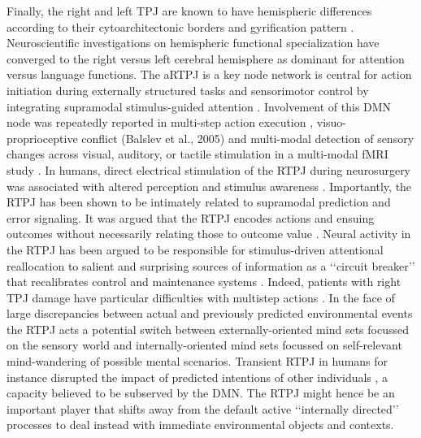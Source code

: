 \documentclass{article} %
\begin{document}
Finally,
the right and left TPJ are known to have hemispheric differences
according to their cytoarchitectonic borders and gyrification pattern
\citep{seghier2013angular}.
Neuroscientific investigations on hemispheric functional specialization
have converged to the right versus left cerebral hemisphere as dominant for
attention versus language functions.
%
The aRTPJ is a key node network is central for
action initiation during externally structured tasks and
sensorimotor control by integrating supramodal stimulus-guided attention
\citep{corbetta2002control}.
Involvement of this DMN node was repeatedly reported in
multi-step action execution \citep{hartmann2005takes},
visuo-proprioceptive conflict (Balslev et al., 2005) and
multi-modal detection of sensory changes across
visual, auditory, or tactile stimulation in a multi-modal fMRI study
\citep{downar2000multimodal}.
In humans, direct electrical stimulation of the
RTPJ during neurosurgery was associated with altered perception
and stimulus awareness \citep{blanke2002neuropsychology}.
%
Importantly, the RTPJ has been shown to be intimately related to
supramodal prediction and error signaling.
It was argued that the RTPJ encodes actions and ensuing outcomes
without necessarily relating those to outcome value
\citep{liljeholm2013neural, hamilton2008action,
jakobs2009effects}.
Neural activity in the RTPJ has been argued to be responsible
for stimulus-driven attentional reallocation to
salient and surprising sources of information
as a ‘‘circuit breaker’’ that recalibrates control and maintenance systems
\citep{bzdok2013tpj, corbettashul2008}.
Indeed, patients with right TPJ damage have particular difficulties
with multistep actions \citep{hartmann2005takes}.
In the face of large discrepancies between actual and previously predicted
environmental events the RTPJ acts a potential switch between
externally-oriented mind sets focussed on the
sensory world and internally-oriented mind sets focussed
on self-relevant mind-wandering of possible mental scenarios.
Transient RTPJ in humans for instance disrupted the
impact of predicted intentions of other individuals
\citep{young2010disruption},
a capacity believed to be subserved by the DMN.
The RTPJ might hence be an important player that shifts away
from the default active ‘‘internally directed’’ processes
to deal instead with immediate environmental objects and contexts.
\end{document}
